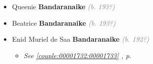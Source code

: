 \documentclass[10pt, openany]{book}
\begin{document}
\begin{itemize}
{\begin{itemize}
{\begin{itemize}
{\begin{itemize}
\item{Sripali \textbf{Bandaranaike} \textcolor{gray}{\textit{(b. 196?)}}
 }
\end{itemize}}
\end{itemize}
 }
\item{Queenie \textbf{Bandaranaike} \textcolor{gray}{\textit{(b. 193?)}}
 }
\item{Beatrice \textbf{Bandaranaike} \textcolor{gray}{\textit{(b. 193?)}}
 }
\item{Enid Muriel de Saa \textbf{Bandaranaike} \textcolor{gray}{\textit{(b. 192?)}}
\begin{itemize}
\item{\textcolor{slteal}{\textit{See  \autoref{couple:00001732:00001733} \textit{, p. \pageref{couple:00001732:00001733} }}}}
\end{itemize}
    }
\end{itemize}}
\end{itemize}
  
\end{document}
